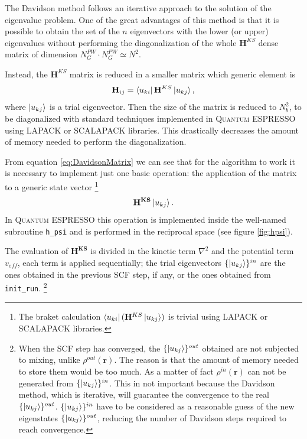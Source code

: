 \documentclass[a4paper,12pt]{article}
\newcommand\mf[1]{\mathbf{#1}}
\newcommand\densin{\rho^{in}(\mathbf{r})}
\newcommand\densout{\rho^{out}(\mathbf{r})}
\newcommand\QE{\textsc{Quantum} ESPRESSO }
\begin{document}
The Davidson method follows an iterative approach to the solution of the eigenvalue problem.
One of the great advantages of this method is that it is possible to obtain the set of the $n$ eigenvectors with the lower (or upper) eigenvalues without performing the diagonalization of the whole $\mf{H}^{KS}$ dense matrix of dimension $N_{G}^{PW} \cdot N_{G}^{PW} \simeq N^2$.

Instead, the $\mf{H}^{KS}$ matrix is reduced in a smaller matrix which generic element is 
\begin{equation}\label{eq:DavidsonMatrix}
	\mf{H}_{ij} = \bra{u_{ki}}\mf{H}^{KS}\ket{u_{kj}},
\end{equation}
where $\ket{u_{kj}}$ is a trial eigenvector. 
Then the size of the matrix is reduced to $N_{b}^2$, to be diagonalized with standard techniques implemented in \QE using LAPACK or SCALAPACK libraries.
This drastically decreases the amount of memory needed to perform the diagonalization.

From equation \eqref{eq:DavidsonMatrix} we can see that for the algorithm to work it is necessary to implement just one basic operation: the application of the matrix to a generic state vector
\footnote{The braket calculation $ \bra{u_{ki}} (\mf{H}^{KS}\ket{u_{kj}})$ is trivial using LAPACK or SCALAPACK libraries.}
\begin{equation}
	\mf{H^{KS}} \ket{u_{kj}}.
\end{equation}
In \QE this operation is implemented inside the well-named subroutine \texttt{h\_psi} and is performed in the reciprocal space (see figure \ref{fig:hpsi}).

The evaluation of $\mf{H^{KS}}$ is divided in the kinetic term $\nabla^2$ and the potential term $v_{eff}$, each term is applied sequentially; 
the trial eigenvectors $\{\ket{u_{kj}}\}^{in}$  are the ones obtained in the previous SCF step, if any, or the ones obtained from \texttt{init\_run}.
\footnote{When the SCF step has converged, the $\{\ket{u_{kj}}\}^{out}$ obtained are not subjected to mixing, unlike $\densout$. The reason is that the amount of memory needed to store them would be too much. 
As a matter of fact $\densin$ can not be generated from $\{\ket{u_{kj}}\}^{in}$.
This in not important because the Davidson method, which is iterative, will guarantee the convergence to the real $\{\ket{u_{kj}}\}^{out}$. 
$\{\ket{u_{kj}}\}^{in}$ have to be considered as a reasonable guess of the new eigenstates $\{\ket{u_{kj}}\}^{out}$, reducing the number of Davidson steps required to reach convergence.
}
\end{document}
